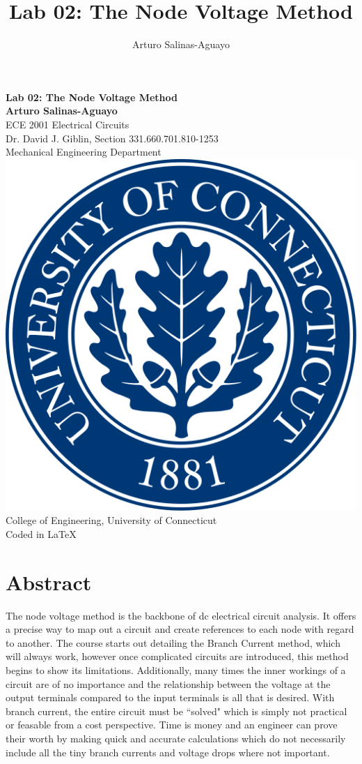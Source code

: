 \documentclass[12pt]{article}
\author{Arturo Salinas-Aguayo}
\title{Lab 02: The Node Voltage Method}
\begin{document}
\newcommand{\closure}[2][3]{%
	{}\mkern#1mu\overline{\mkern-#1mu#2}}
\newcommand\ncoverline[1]{\mkern1mu\overline{\mkern-1mu#1\mkern-1mu}\mkern1mu}
\begin{titlepage}
	\centering
	\vspace*{3cm}
	\huge\textbf{Lab 02: The Node Voltage Method}\\
	\vspace{5cm}
	\Large\textbf{Arturo Salinas-Aguayo}\\
	\normalsize
	ECE 2001 Electrical Circuits\\
	Dr. David J. Giblin, Section 331.660.701.810-1253\\
	Mechanical Engineering Department
	\vfill
	\includegraphics[scale=0.1]{uconnlogo}\\
	College of Engineering, University of Connecticut\\
	\scriptsize{Coded in \LaTeX}
	\vspace*{1cm}
\end{titlepage}
\section*{Abstract}
The node voltage method is the backbone of dc electrical circuit analysis. It
offers a precise way to map out a circuit and create references to each node
with regard to another. The course starts out detailing the Branch Current
method, which will always work, however once complicated circuits are
introduced, this method begins to show its limitations. Additionally, many times
the inner workings of a circuit are of no importance and the relationship
between the voltage at the output terminals compared to the input terminals is
all that is desired. With branch current, the entire circuit must be ``solved"
which is simply not practical or feasable from a cost perspective. Time is money
and an engineer can prove their worth by making quick and accurate calculations
which do not necessarily include all the tiny branch currents and voltage drops
where not important.
\end{document}
